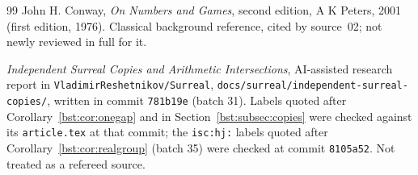 \documentclass[11pt,letterpaper]{article}
\theoremstyle{definition}
\theoremstyle{remark}
\newcommand{\repo}{\texttt{VladimirReshetnikov/Surreal}}
\begin{document}
\begin{thebibliography}{99}
John H. Conway,
\emph{On Numbers and Games}, second edition, A K Peters, 2001
(first edition, 1976). Classical background reference, cited by source~02;
not newly reviewed in full for it.

\emph{Independent Surreal Copies and Arithmetic Intersections}, AI-assisted
research report in \repo, \texttt{docs/surreal/independent-surreal-copies/},
written in commit \texttt{781b19e} (batch 31). Labels quoted after
Corollary~\ref{bst:cor:onegap} and in Section~\ref{bst:subsec:copies} were checked
against its \texttt{article.tex} at that commit; the \texttt{isc:hj:} labels quoted
after Corollary~\ref{bst:cor:realgroup} (batch 35) were checked at commit
\texttt{8105a52}. Not treated as a refereed source.
\end{thebibliography}
\end{document}
